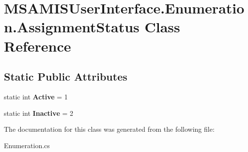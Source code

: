 \hypertarget{class_m_s_a_m_i_s_user_interface_1_1_enumeration_1_1_assignment_status}{}\section{M\+S\+A\+M\+I\+S\+User\+Interface.\+Enumeration.\+Assignment\+Status Class Reference}
\label{class_m_s_a_m_i_s_user_interface_1_1_enumeration_1_1_assignment_status}
\subsection*{Static Public Attributes}
\begin{DoxyCompactItemize}
\item 
\mbox{\label{class_m_s_a_m_i_s_user_interface_1_1_enumeration_1_1_assignment_status_ab678ffbb197d580c19cbc48a0522f819}} 
static int {\bfseries Active} = 1
\item 
\mbox{\label{class_m_s_a_m_i_s_user_interface_1_1_enumeration_1_1_assignment_status_a815e8e644da44bc57077420cf2fa9f7e}} 
static int {\bfseries Inactive} = 2
\end{DoxyCompactItemize}


The documentation for this class was generated from the following file\+:\begin{DoxyCompactItemize}
\item 
Enumeration.\+cs\end{DoxyCompactItemize}
